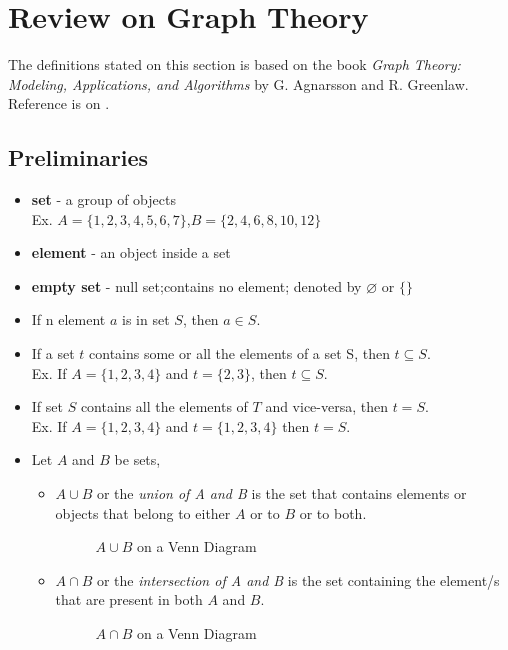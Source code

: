 \section{Review on Graph Theory}
The definitions stated on this section is based on the book \textit{Graph Theory: Modeling, Applications, and Algorithms} by G. Agnarsson and R. Greenlaw. Reference is on \cite{agnarsson2006graph}.
\subsection{Preliminaries}
\begin{itemize}
	\item \textbf{set} - a group of objects\\
	Ex. $A=\{1,2,3,4,5,6,7\}$,$B=\{2,4,6,8,10,12\}$ 
	\item \textbf{element} - an object inside a set
	\item \textbf{empty set} - null set;contains no element; denoted by $\varnothing$ or $\{\}$
	\item If n element $a$ is in set $S$, then $a \in S $.
	\item If a set $t$ contains some or all the elements of a set S, then $t \subseteq S$.\\
	Ex. If $A=\{1,2,3,4\}$ and $t=\{2,3\}$, then $t \subseteq S$.
	\item If set $S$ contains all the elements of $T$ and vice-versa, then $t=S$.\\
	Ex. If $A=\{1,2,3,4\}$ and $t=\{1,2,3,4\}$ then $t=S$.
	
	\item Let $A$ and $B$ be sets,
	\begin{itemize}
		\item $A \cup B$ or the \textit{union of A and B} is the set that contains elements or objects that belong to either $A$ or to $B$ or to both.
		\begin{figure}[!ht]
			\centering
			\caption{$A \cup B$ on a Venn Diagram}
		\end{figure}
		
		\item $A \cap B$ or the \textit{intersection of A and B} is the set containing the element/s that are present in both $A$ and $B$.
		\begin{figure}[!ht]
			\centering
			\caption{$A \cap B$ on a Venn Diagram}		
		\end{figure}
		

\end{itemize}
\end{itemize}
